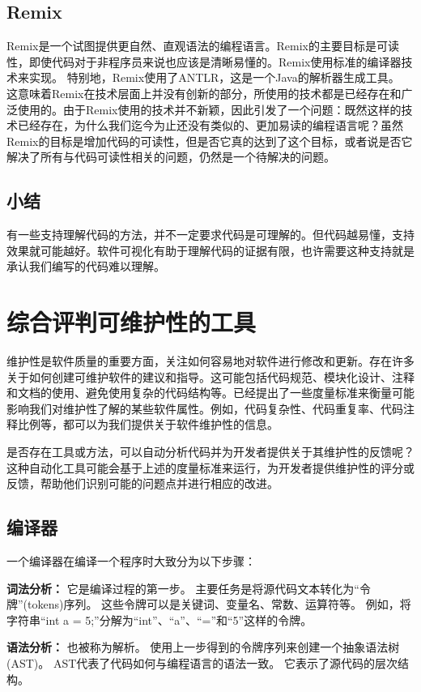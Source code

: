 \subsection{Remix}
Remix是一个试图提供更自然、直观语法的编程语言。Remix的主要目标是可读性，即使代码对于非程序员来说也应该是清晰易懂的。Remix使用标准的编译器技术来实现。
特别地，Remix使用了ANTLR，这是一个Java的解析器生成工具。
这意味着Remix在技术层面上并没有创新的部分，所使用的技术都是已经存在和广泛使用的。由于Remix使用的技术并不新颖，因此引发了一个问题：既然这样的技术已经存在，为什么我们迄今为止还没有类似的、更加易读的编程语言呢？虽然Remix的目标是增加代码的可读性，但是否它真的达到了这个目标，或者说是否它解决了所有与代码可读性相关的问题，仍然是一个待解决的问题。

\subsection{小结}
有一些支持理解代码的方法，并不一定要求代码是可理解的。但代码越易懂，支持效果就可能越好。软件可视化有助于理解代码的证据有限，也许需要这种支持就是承认我们编写的代码难以理解。


\section{综合评判可维护性的工具}
维护性是软件质量的重要方面，关注如何容易地对软件进行修改和更新。存在许多关于如何创建可维护软件的建议和指导。这可能包括代码规范、模块化设计、注释和文档的使用、避免使用复杂的代码结构等。已经提出了一些度量标准来衡量可能影响我们对维护性了解的某些软件属性。例如，代码复杂性、代码重复率、代码注释比例等，都可以为我们提供关于软件维护性的信息。

是否存在工具或方法，可以自动分析代码并为开发者提供关于其维护性的反馈呢？这种自动化工具可能会基于上述的度量标准来运行，为开发者提供维护性的评分或反馈，帮助他们识别可能的问题点并进行相应的改进。

\subsection{编译器}
一个编译器在编译一个程序时大致分为以下步骤：

\textbf{词法分析：}
它是编译过程的第一步。
主要任务是将源代码文本转化为“令牌”(tokens)序列。
这些令牌可以是关键词、变量名、常数、运算符等。
例如，将字符串``int a = 5;”分解为``int”、``a”、``=”和``5”这样的令牌。

\textbf{语法分析：}
也被称为解析。
使用上一步得到的令牌序列来创建一个抽象语法树(AST)。
AST代表了代码如何与编程语言的语法一致。
它表示了源代码的层次结构。

